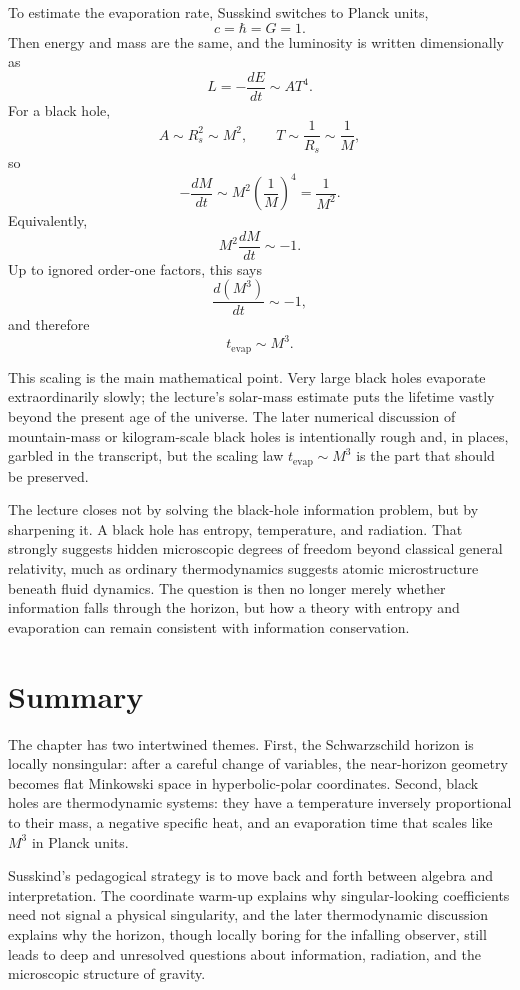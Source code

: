 To estimate the evaporation rate, Susskind switches to Planck units,
\[
c=\hbar=G=1.
\]
Then energy and mass are the same, and the luminosity is written dimensionally as
\begin{equation}
L = -\frac{dE}{dt} \sim A T^4.
\end{equation}
For a black hole,
\begin{equation}
A \sim R_s^2 \sim M^2,
\qquad
T \sim \frac{1}{R_s} \sim \frac{1}{M},
\end{equation}
so
\begin{equation}
-\frac{dM}{dt} \sim M^2\left(\frac{1}{M}\right)^4 = \frac{1}{M^2}.
\end{equation}
Equivalently,
\begin{equation}
M^2\frac{dM}{dt} \sim -1.
\end{equation}
Up to ignored order-one factors, this says
\begin{equation}
\frac{d(M^3)}{dt} \sim -1,
\end{equation}
and therefore
\begin{equation}
t_{\mathrm{evap}} \sim M^3.
\end{equation}

This scaling is the main mathematical point. Very large black holes evaporate extraordinarily slowly; the lecture's solar-mass estimate puts the lifetime vastly beyond the present age of the universe. The later numerical discussion of mountain-mass or kilogram-scale black holes is intentionally rough and, in places, garbled in the transcript, but the scaling law \(t_{\mathrm{evap}}\sim M^3\) is the part that should be preserved.

The lecture closes not by solving the black-hole information problem, but by sharpening it. A black hole has entropy, temperature, and radiation. That strongly suggests hidden microscopic degrees of freedom beyond classical general relativity, much as ordinary thermodynamics suggests atomic microstructure beneath fluid dynamics. The question is then no longer merely whether information falls through the horizon, but how a theory with entropy and evaporation can remain consistent with information conservation.

\section{Summary}

The chapter has two intertwined themes. First, the Schwarzschild horizon is locally nonsingular: after a careful change of variables, the near-horizon geometry becomes flat Minkowski space in hyperbolic-polar coordinates. Second, black holes are thermodynamic systems: they have a temperature inversely proportional to their mass, a negative specific heat, and an evaporation time that scales like \(M^3\) in Planck units.

Susskind's pedagogical strategy is to move back and forth between algebra and interpretation. The coordinate warm-up explains why singular-looking coefficients need not signal a physical singularity, and the later thermodynamic discussion explains why the horizon, though locally boring for the infalling observer, still leads to deep and unresolved questions about information, radiation, and the microscopic structure of gravity.